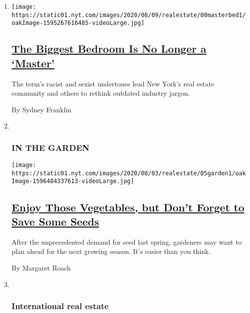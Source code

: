 \begin{enumerate}
\def\labelenumi{\arabic{enumi}.}
\item
  \texttt{[image: https://static01.nyt.com/images/2020/08/09/realestate/00masterbed1/oakImage-1595267616485-videoLarge.jpg]}

  \hypertarget{the-biggest-bedroom-is-no-longer-a-master}{%
  \subsection{\texorpdfstring{\href{/2020/08/05/realestate/master-bedroom-change.html}{The
  Biggest Bedroom Is No Longer a
  `Master'}}{The Biggest Bedroom Is No Longer a `Master'}}\label{the-biggest-bedroom-is-no-longer-a-master}}

  The term's racist and sexist undertones lead New York's real estate
  community and others to rethink outdated industry jargon.

  By Sydney Franklin
\item ~
  \hypertarget{in-the-garden}{%
  \subsubsection{IN THE GARDEN}\label{in-the-garden}}

  \texttt{[image: https://static01.nyt.com/images/2020/08/03/realestate/05garden1/oakImage-1596484337613-videoLarge.jpg]}

  \hypertarget{enjoy-those-vegetables-but-dont-forget-to-save-some-seeds}{%
  \subsection{\texorpdfstring{\href{/2020/08/05/realestate/garden-vegetables-save-seeds-build-supply.html}{Enjoy
  Those Vegetables, but Don't Forget to Save Some
  Seeds}}{Enjoy Those Vegetables, but Don't Forget to Save Some Seeds}}\label{enjoy-those-vegetables-but-dont-forget-to-save-some-seeds}}

  After the unprecedented demand for seed last spring, gardeners may
  want to plan ahead for the next growing season. It's easier than you
  think.

  By Margaret Roach
\item ~
  \hypertarget{international-real-estate}{%
  \subsubsection{International real
  estate}\label{international-real-estate}}


\end{enumerate}
